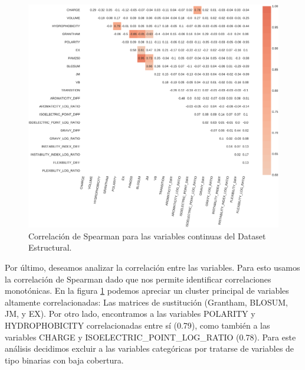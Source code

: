 \begin{figure}[H]
    \centering
    \includegraphics[scale=0.25]{documents/latex/figures/3/structural/structural_corr.pdf}
    \caption{Correlación de Spearman para las variables continuas del Dataset Estructural.}
    \label{fig:corrplot_structural}
\end{figure}

Por último, deseamos analizar la correlación entre las variables. Para esto usamos la correlación de Spearman dado que nos permite identificar correlaciones monotónicas. En la figura \ref{fig:corrplot_structural} podemos apreciar un cluster principal de variables altamente correlacionadas: Las matrices de sustitución (Grantham, BLOSUM, JM, y EX). Por otro lado, encontramos a las variables POLARITY y HYDROPHOBICITY correlacionadas entre sí (0.79), como también a las variables CHARGE y ISOELECTRIC\_POINT\_LOG\_RATIO (0.78). Para este análisis decidimos excluir a las variables categóricas por tratarse de variables de tipo binarias con baja cobertura. 





